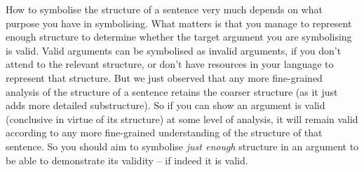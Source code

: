 How to symbolise the structure of a sentence very much depends on what purpose you have in symbolising. What matters is that you manage to represent enough structure to determine whether the target argument you are symbolising is valid. Valid arguments can be symbolised as invalid arguments, if you don't attend to the relevant structure, or don't have resources in your language to represent that structure. But we just observed that any more fine-grained analysis of the structure of a sentence retains the coarser structure (as it just adds more detailed substructure). So if you can show an argument is valid (conclusive in virtue of its structure) at some level of analysis, it will remain valid according to any more fine-grained understanding of the structure of that sentence. So you should aim to symbolise \emph{just enough} structure in an argument to be able to demonstrate its validity – if indeed it is valid. 



